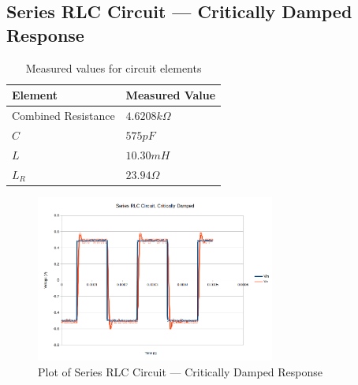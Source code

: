 \documentclass[10pt]{article}
\begin{document}
\subsection*{Series RLC Circuit --- Critically Damped Response}
\begin{table}[H]
	\centering
	\begin{tabular}{ll}
		\hline
		\textbf{Element} & \textbf{Measured Value}\\
		\hline
		Combined Resistance & $4.6208 k\Omega$\\
		$C$ & $575pF$\\
		$L$ & $10.30mH$\\
		$L_R$ & $23.94\Omega$\\
		\hline
	\end{tabular}
	\caption{Measured values for circuit elements}
\end{table}
\begin{figure}[H]
	\centering
	\includegraphics[width=0.7\textwidth]{RLC_Crit.png}
	\caption{Plot of Series RLC Circuit --- Critically Damped Response}
\end{figure}
\end{document}

